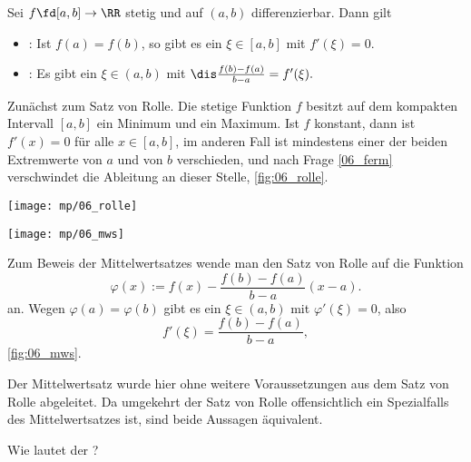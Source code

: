 \begin{antwort}
Sei $f\fd [a,b] \to \RR$ stetig und auf $(a,b)$ differenzierbar.  
Dann gilt

\begin{itemize}
\item {}: 
Ist $f(a)=f(b)$, so gibt es ein $\xi\in [a,b]$ mit $f'(\xi)=0$.

\medskip
\item {}: Es gibt ein $\xi \in (a,b)$ mit 
$\dis \frac{ f(b)-f(a) }{b-a} = f' (\xi ).$
\end{itemize}

Zunächst zum Satz von Rolle. 
Die stetige Funktion $f$ besitzt auf dem kompakten Intervall 
$[a,b]$ ein 
Minimum und ein Maximum. Ist $f$ konstant, dann ist $f'(x)=0$
für alle $x\in [a,b]$, im anderen Fall ist mindestens 
einer der beiden Extremwerte von $a$ und von $b$ verschieden, 
und nach Frage \ref{06_ferm} verschwindet die Ableitung an dieser 
Stelle, \sieheAbbildung\ref{fig:06_rolle}.

\begin{center}
  \begin{minipage}{60mm}
  \texttt{[image: mp/06\_rolle]}
  \label{fig:06_rolle}
\end{minipage}
\qquad
\begin{minipage}{60mm}
  \texttt{[image: mp/06\_mws]}
  \label{fig:06_mws}
\end{minipage}
\end{center}

Zum Beweis der Mittelwertsatzes wende man den Satz von Rolle 
auf die Funktion 
\[
\varphi(x) := f(x)-\frac{f(b)-f(a)}{b-a} (x-a).  
\]
an. Wegen $\varphi(a)=\varphi(b)$ gibt es ein $\xi \in (a,b)$ mit 
$\varphi'(\xi)=0$, also  
\[
f'(\xi)=\frac{f(b)-f(a)}{b-a},
\]
\sieheAbbildung\ref{fig:06_mws}. 

Der Mittelwertsatz wurde hier ohne weitere Voraussetzungen aus dem 
Satz von Rolle abgeleitet. Da umgekehrt der Satz von Rolle 
offensichtlich ein Spezialfalls des Mittelwertsatzes ist, 
sind beide Aussagen äquivalent.  
\AntEnd
\end{antwort}



\begin{frage}\label{q:mittelwertsatz-der-differenzialrechnung}
Wie lautet der ?
\end{frage}

